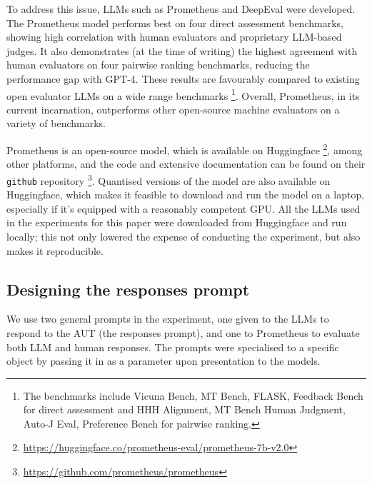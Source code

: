 \documentclass{article}
\begin{document}
To address this issue, LLMs such as Prometheus \citet{kim2024prometheusinducingfinegrainedevaluation} and DeepEval \citet{yang2024largemultimodalmodelsuncover} were developed. The Prometheus model performs best on four direct assessment benchmarks, showing high correlation with human evaluators and proprietary LLM-based judges. It also demonstrates (at the time of writing) the highest agreement with human evaluators on four pairwise ranking benchmarks, reducing the performance gap with GPT-4. These results are favourably compared to existing open evaluator LLMs on a wide range benchmarks \footnote{The benchmarks include Vicuna Bench, MT Bench, FLASK, Feedback Bench for direct assessment and HHH Alignment, MT Bench Human Judgment, Auto-J Eval, Preference Bench for pairwise ranking.}. Overall, Prometheus, in its current incarnation, outperforms other open-source machine evaluators on a variety of benchmarks. 

 Prometheus is an open-source model, which is available on Huggingface \footnote{\url{https://huggingface.co/prometheus-eval/prometheus-7b-v2.0}}, among other platforms, and the code and extensive documentation can be found on their \texttt{github} repository \footnote{\url{https://github.com/prometheus/prometheus}}. Quantised versions of the model are also available on Huggingface, which makes it feasible to download and run the model on a laptop, especially if it's equipped with a reasonably competent GPU. All the LLMs used in the experiments for this paper were downloaded from Huggingface and run locally; this not only lowered the expense of conducting the experiment, but also makes it reproducible. 

\subsection{Designing the responses prompt}
\label{sec:designing_prompt}

% 


We use two general prompts in the experiment, one given to the LLMs to respond to the AUT (the responses prompt), and one to Prometheus to evaluate both LLM and human responses. The prompts were specialised to a specific object by passing it in as a parameter upon presentation to the models.
\end{document}
